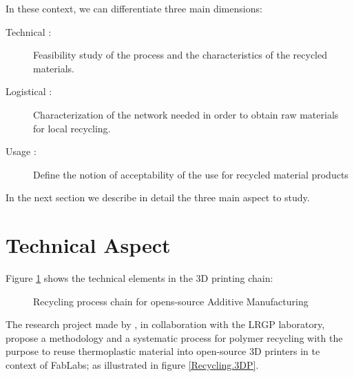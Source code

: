 In these context, we can differentiate three main dimensions:

\begin{description}
	\item[Technical :] Feasibility study of the process and the characteristics of the recycled materials.
	\item[Logistical :]  Characterization of the network needed in order to obtain raw materials   for local recycling.
	\item[Usage :] Define the notion of acceptability of the use for recycled material products
\end{description}


In the next section we describe in detail the three main aspect to study.

\section{Technical Aspect}

Figure \ref{3D.Printing.Chain} shows the technical elements in the 3D printing chain:

\begin{figure}[H]
	\centering
	\caption{Recycling process chain for opens-source Additive Manufacturing}
	\label{3D.Printing.Chain}
\end{figure}

The research project made by \textcite{CruzSanchez2017, CruzSanchez2014, Cruz2012}, in collaboration with the LRGP laboratory,  propose a methodology and a systematic process for polymer recycling with the purpose to reuse thermoplastic material into open-source 3D printers in te context of FabLabs; as illustrated in figure \ref{Recycling.3DP}.


